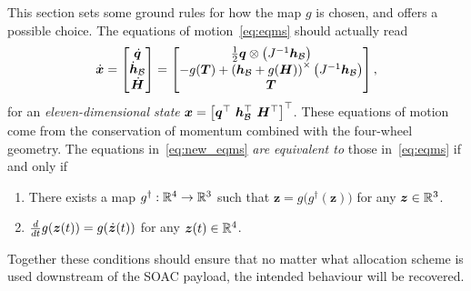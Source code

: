 \documentclass[10pt]{article}
\begin{document}
This section sets some ground rules for how the map $g$ is chosen, and offers a possible choice. The equations of motion~\eqref{eq:eqms} should actually read 
\begin{equation}
\dot{\bm{x}} = \begin{bmatrix}
\dot{\bm{q}} \\ \dot{\bm{h}}_{\mathcal{B}} \\ \dot{\bm{H}}
\end{bmatrix} = \begin{bmatrix}
\tfrac{1}{2} \bm{q} \otimes \left(J^{-1} \bm{h}_{\mathcal{B}} \right) \\
-g(\bm{T}) + \left( \bm{h}_{\mathcal{B}} + g(\bm{H}) \right)^{\times} \left( J^{-1} \bm{h}_{\mathcal{B}} \right) \\
\bm{T}
\end{bmatrix},
\label{eq:new_eqms}
\end{equation}
for an \textit{eleven-dimensional state} $\bm{x} = \left[ \q\tran \ \hB\tran \ \bm{H}\tran \right]\tran$. These equations of motion come from the conservation of momentum combined with the four-wheel geometry. The equations in~\eqref{eq:new_eqms} \textit{are equivalent to} those in~\eqref{eq:eqms} if and only if
\begin{enumerate}
\item There exists a map $g^{\dagger} : {\mathbb{R}}^4 \rightarrow {\mathbb{R}}^3$ such that $\bm{z} = g\big( g^{\dagger}(\bm{z})\big)$ for any $\bm{z}\in{\mathbb{R}}^3$. 
\item $\frac{d }{d t}g(\bm{z}(t)) = g(\dot{\bm{z}}(t))$ for any $\bm{z}(t)\in{\mathbb{R}}^4$.
\end{enumerate}
Together these conditions should ensure that no matter what allocation scheme is used downstream of the SOAC payload, the intended behaviour will be recovered. 
\end{document}

